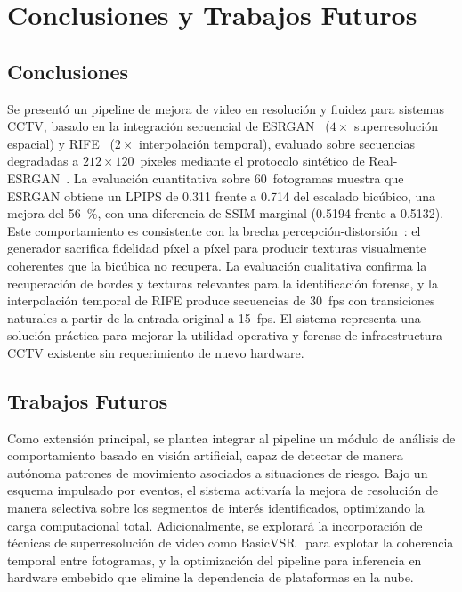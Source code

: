 \documentclass[conference]{IEEEtran}
\begin{document}
\section{Conclusiones y Trabajos Futuros}

\subsection{Conclusiones}

Se presentó un pipeline de mejora de video en resolución y fluidez para sistemas CCTV, basado en la integración secuencial de ESRGAN~\cite{wang2018esrgan} ($4\times$ superresolución espacial) y RIFE~\cite{huang2022rife} ($2\times$ interpolación temporal), evaluado sobre secuencias degradadas a $212\times120$~píxeles mediante el protocolo sintético de Real-ESRGAN~\cite{wang2021realesrgan}. La evaluación cuantitativa sobre 60~fotogramas muestra que ESRGAN obtiene un LPIPS de 0.311 frente a 0.714 del escalado bicúbico, una mejora del 56~\%, con una diferencia de SSIM marginal (0.5194 frente a 0.5132). Este comportamiento es consistente con la brecha percepción-distorsión~\cite{blau2018perception}: el generador sacrifica fidelidad píxel a píxel para producir texturas visualmente coherentes que la bicúbica no recupera. La evaluación cualitativa confirma la recuperación de bordes y texturas relevantes para la identificación forense, y la interpolación temporal de RIFE produce secuencias de 30~fps con transiciones naturales a partir de la entrada original a 15~fps. El sistema representa una solución práctica para mejorar la utilidad operativa y forense de infraestructura CCTV existente sin requerimiento de nuevo hardware.

\subsection{Trabajos Futuros}

Como extensión principal, se plantea integrar al pipeline un módulo de análisis de comportamiento basado en visión artificial, capaz de detectar de manera autónoma patrones de movimiento asociados a situaciones de riesgo. Bajo un esquema impulsado por eventos, el sistema activaría la mejora de resolución de manera selectiva sobre los segmentos de interés identificados, optimizando la carga computacional total. Adicionalmente, se explorará la incorporación de técnicas de superresolución de video como BasicVSR~\cite{chan2021basicvsr} para explotar la coherencia temporal entre fotogramas, y la optimización del pipeline para inferencia en hardware embebido que elimine la dependencia de plataformas en la nube.



\end{document}
